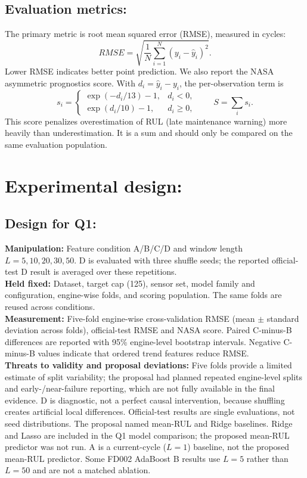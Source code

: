\documentclass[10pt,a4paper]{article}
\begin{document}
\subsection{Evaluation metrics:}
The primary metric is root mean squared error (RMSE), measured in cycles:
\[
RMSE=\sqrt{\frac{1}{N}\sum_{i=1}^{N}(y_i-\hat y_i)^2}.
\]
Lower RMSE indicates better point prediction. We also report the NASA asymmetric prognostics score. With $d_i=\hat y_i-y_i$, the per-observation term is
\[
s_i=\begin{cases}\exp(-d_i/13)-1,&d_i<0,\\\exp(d_i/10)-1,&d_i\geq0,\end{cases}\qquad S=\sum_i s_i.
\]
This score penalizes overestimation of RUL (late maintenance warning) more heavily than underestimation. It is a sum and should only be compared on the same evaluation population.

\section{Experimental design:}
\subsection{Design for Q1:}
\textbf{Manipulation:} Feature condition A/B/C/D and window length $L=5,10,20,30,50$. D is evaluated with three shuffle seeds; the reported official-test D result is averaged over these repetitions.\\
\textbf{Held fixed:} Dataset, target cap (125), sensor set, model family and configuration, engine-wise folds, and scoring population. The same folds are reused across conditions.\\
\textbf{Measurement:} Five-fold engine-wise cross-validation RMSE (mean $\pm$ standard deviation across folds), official-test RMSE and NASA score. Paired C-minus-B differences are reported with 95\% engine-level bootstrap intervals. Negative C-minus-B values indicate that ordered trend features reduce RMSE.\\
\textbf{Threats to validity and proposal deviations:} Five folds provide a limited estimate of split variability; the proposal had planned repeated engine-level splits and early-/near-failure reporting, which are not fully available in the final evidence. D is diagnostic, not a perfect causal intervention, because shuffling creates artificial local differences. Official-test results are single evaluations, not seed distributions. The proposal named mean-RUL and Ridge baselines. Ridge and Lasso are included in the Q1 model comparison; the proposed mean-RUL predictor was not run. A is a current-cycle ($L=1$) baseline, not the proposed mean-RUL predictor. Some FD002 AdaBoost B results use $L=5$ rather than $L=50$ and are not a matched ablation.
\end{document}
